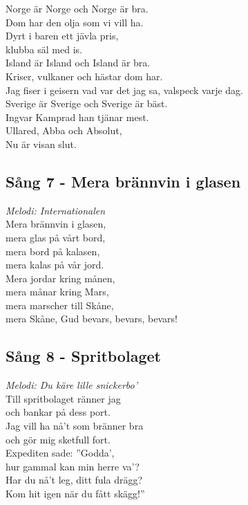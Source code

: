 \documentclass[a5paper]{article}
\begin{document}
\noindent 
Norge är Norge och Norge är bra. \\
Dom har den olja som vi vill ha. \\
Dyrt i baren ett jävla pris, \\
klubba säl med is. \\

\noindent 
Island är Island och Island är bra. \\
Kriser, vulkaner och hästar dom har. \\
Jag fiser i geisern vad var det jag sa, valspeck varje dag. \\

\noindent 
Sverige är Sverige och Sverige är bäst. \\
Ingvar Kamprad han tjänar mest. \\
Ullared, Abba och Absolut, \\
Nu är visan slut. \\


\subsection{Sång 7 - Mera brännvin i glasen}
\textit{Melodi: Internationalen} \\

\noindent
Mera brännvin i glasen, \\
mera glas på vårt bord, \\
mera bord på kalasen, \\
mera kalas på vår jord. \\
 
\noindent
Mera jordar kring månen, \\
mera månar kring Mars, \\
mera marscher till Skåne, \\
mera Skåne, Gud bevars, bevars, bevars! \\


\newpage
\subsection{Sång 8 - Spritbolaget}

\textit{Melodi: Du käre lille snickerbo’} \\

\noindent
Till spritbolaget ränner jag \\
och bankar på dess port. \\
Jag vill ha nå’t som bränner bra \\
och gör mig sketfull fort. \\
Expediten sade: ”Godda’, \\
hur gammal kan min herre va’? \\
Har du nå’t leg, ditt fula drägg? \\
Kom hit igen när du fått skägg!” \\
\end{document}

